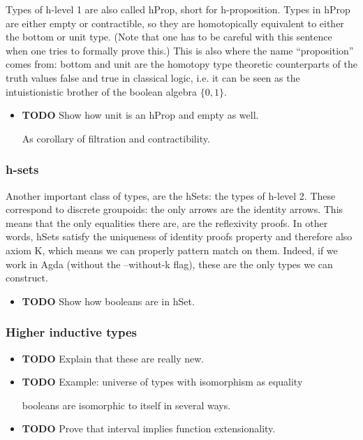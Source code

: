 Types of h-level 1 are also called hProp, short for
h-proposition. Types in hProp are either empty or contractible, so
they are homotopically equivalent to either the bottom or unit
type. (Note that one has to be careful with this sentence when one
tries to formally prove this.) This is also where the name
``proposition'' comes from: bottom and unit are the homotopy type
theoretic counterparts of the truth values false and true in classical
logic, i.e. it can be seen as the intuistionistic brother of the boolean
algebra $\{0,1\}$. 

\begin{itemize}

\item \textbf{TODO} Show how unit is an hProp and empty as well.\\
\label{sec-2.3.4.1}

As corollary of filtration and contractibility.

\end{itemize} %
\subsubsection{h-sets}
\label{sec-2.3.5}


Another important class of types, are the hSets: the types of
h-level 2. These correspond to discrete groupoids: the only arrows are
the identity arrows. This means that the only equalities there are,
are the reflexivity proofs. In other words, hSets satisfy the
uniqueness of identity proofs property and therefore also axiom K,
which means we can properly pattern match on them. Indeed, if we work
in Agda (without the --without-k flag), these are the only types we
can construct.

\begin{itemize}

\item \textbf{TODO} Show how booleans are in hSet.\\
\label{sec-2.3.5.1}


\end{itemize} %
\subsubsection{Higher inductive types}
\label{sec-2.3.6}


\begin{itemize}

\item \textbf{TODO} Explain that these are really new.\\
\label{sec-2.3.6.1}



\item \textbf{TODO} Example: universe of types with isomorphism as equality\\
\label{sec-2.3.6.2}

booleans are isomorphic to itself in several ways.


\item \textbf{TODO} Prove that interval implies function extensionality.\\
\label{sec-2.3.6.3}


\end{itemize} %
